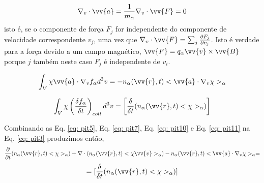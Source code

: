 \documentclass[12pt,oneside,a4paper]{abntex2}
\begin{document}
\begin{equation}
\label{eq: pit9}
\nabla_v \cdot \vv{a} = \frac{1}{m_\alpha} \nabla_v \cdot \vv{F} = 0
\end{equation}
isto é, se o componente de força $F_j$ for independente do componente de velocidade correspondente $v_j$, uma vez que $\nabla_v \cdot \vv{F} = \sum_j \frac{\partial F_j}{\partial v_j}$. Isto é verdade para a força devido a um campo magnético, $\vv{F} = q_\alpha \vv{v} \times \vv{B}$ porque $j$ também neste caso $F_j$ é independente de $v_i$.

\begin{equation}
\label{eq: pit10}
\int_V \chi \vv{a} \cdot \nabla_v f_\alpha d^3 v = -n_\alpha(\vv{r},t)<\vv{a} \cdot \nabla_v \chi>_\alpha
\end{equation}

\begin{equation}
\label{eq: pit11}
\int_V \chi \left( \frac{\delta f_\alpha}{\delta t} \right)_{coll} d^3 v = \left[\frac{\delta}{\delta t}(n_\alpha(\vv{r},t)<\chi>_\alpha)\right]
\end{equation}

Combinando as Eq. \ref{eq: pit5}, Eq. \ref{eq: pit7}, Eq. \ref{eq: pit10} e Eq. \ref{eq: pit11} na Eq. \ref{eq: pit3} produzimos então,
\begin{equation}
\label{eq: pit12}
\frac{\partial }{\partial t}(n_\alpha(\vv{r},t)<\chi>_\alpha) + \nabla \cdot (n_\alpha(\vv{r},t)<\chi \vv{v} >_\alpha) - n_\alpha(\vv{r},t)<\vv{a} \cdot \nabla_v \chi>_\alpha = 
\end{equation}
\begin{equation*}
=[\frac{\delta}{\delta t}(n_\alpha(\vv{r},t)<\chi>_\alpha)]
\end{equation*}
\end{document}
